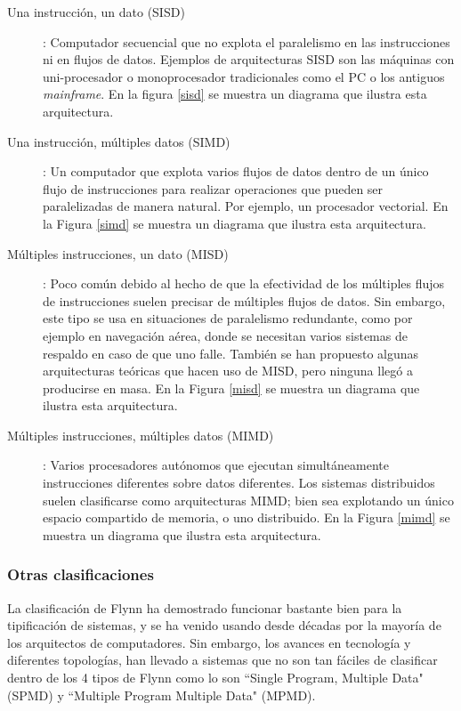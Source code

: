 \begin{description}
	\item [Una instrucción, un dato (SISD)] : Computador secuencial que no explota el paralelismo en las instrucciones ni en flujos de
        datos. Ejemplos de arquitecturas SISD son las máquinas con uni-procesador o monoprocesador tradicionales como el PC o los antiguos
        \textit{mainframe}. En la figura \ref{sisd} se muestra un diagrama que ilustra esta arquitectura.
			
	\item [Una instrucción, múltiples datos (SIMD)] : Un computador que explota varios flujos de datos dentro de un único flujo de
        instrucciones para realizar operaciones que pueden ser paralelizadas de manera natural. Por ejemplo, un procesador vectorial. En la
        Figura \ref{simd} se muestra un diagrama que ilustra esta arquitectura.
	
	\item [Múltiples instrucciones, un dato (MISD)] : Poco común debido al hecho de que la efectividad de los múltiples flujos de
        instrucciones suelen precisar de múltiples flujos de datos. Sin embargo, este tipo se usa en situaciones de paralelismo redundante,
        como por ejemplo en navegación aérea, donde se necesitan varios sistemas de respaldo en caso de que uno falle. También se han
        propuesto algunas arquitecturas teóricas que hacen uso de MISD, pero ninguna llegó a producirse en masa. En la Figura \ref{misd} se
        muestra un diagrama que ilustra esta arquitectura.

	\item [Múltiples instrucciones, múltiples datos (MIMD)] : Varios procesadores autónomos que ejecutan simultáneamente instrucciones
        diferentes sobre datos diferentes. Los sistemas distribuidos suelen clasificarse como arquitecturas MIMD; bien sea explotando un
        único espacio compartido de memoria, o uno distribuido. En la Figura \ref{mimd} se muestra un diagrama que ilustra esta
        arquitectura.
\end{description}

\subsubsection{Otras clasificaciones}

La clasificación de Flynn ha demostrado funcionar bastante bien para la tipificación de sistemas, y se ha venido usando desde décadas por la
mayoría de los arquitectos de computadores. Sin embargo, los avances en tecnología y diferentes topologías, han llevado a sistemas que no
son tan fáciles de clasificar dentro de los 4 tipos de Flynn como lo son ``Single Program, Multiple Data" (SPMD) y ``Multiple Program
Multiple Data" (MPMD).
	
